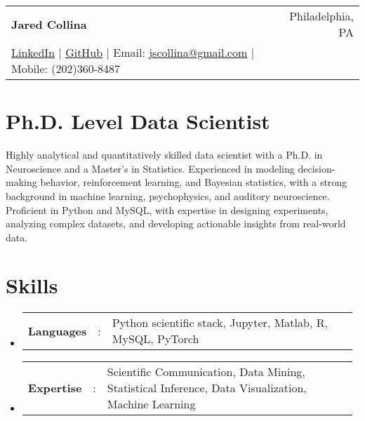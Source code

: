 \documentclass[a4paper,11pt]{article}
\newcommand{\resumeSectionType}[3]{
  \item\begin{tabular*}{0.96\textwidth}[t]{
    p{0.15\linewidth}p{0.02\linewidth}p{0.81\linewidth}
  }
    \textbf{#1} & #2 & #3
  \end{tabular*}\vspace{-2pt}
}
\newcommand{\resumeHeadingListStart}{
  \begin{itemize}[leftmargin=0.15in, label={}]
}
\newcommand{\resumeHeadingListEnd}{\end{itemize}}
\begin{document}

\begin{tabular*}{\textwidth}{l@{\extracolsep{\fill}}r}
  \textbf{\Huge Jared Collina \vspace{2pt}} & %
  Philadelphia, PA \\ %
  \href{https://linkedin.com/in/jaredcollina}{\uline{LinkedIn}} $|$ %
  \href{https://github.com/jcollina}{\uline{GitHub}} $|$ %
  Email: \href{mailto:jscollina@gmail.com}{\uline{jscollina@gmail.com}} $|$ %
  Mobile: (202)360-8487 \\ %
\end{tabular*}



\section{Ph.D. Level Data Scientist}
\small{Highly analytical and quantitatively skilled data scientist with a Ph.D. in Neuroscience and a Master's in Statistics. Experienced in modeling decision-making behavior, reinforcement learning, and Bayesian statistics, with a strong background in machine learning, psychophysics, and auditory neuroscience. Proficient in Python and MySQL, with expertise in designing experiments, analyzing complex datasets, and developing actionable insights from real-world data.}



\section{Skills}
  \resumeHeadingListStart{}
    \resumeSectionType{Languages}{:}{Python scientific stack, Jupyter, Matlab, R, MySQL, PyTorch}
    \resumeSectionType{Expertise}{:}{Scientific Communication, Data Mining, Statistical Inference, Data Visualization, Machine Learning}
  \resumeHeadingListEnd{}
\end{document}
